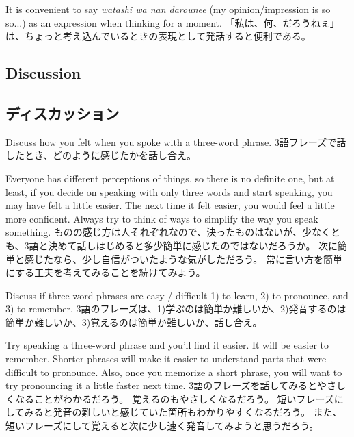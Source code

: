\documentclass[uplatex,dvipdfmx,b5paper,english,10pt]{jsbook}
\begin{document}
\begin{toianswer}
\ifEnglish
It is convenient to say {\it watashi wa nan darounee\/} (my opinion/impression is so so...) as an expression when thinking for a moment.
\else
「私は、何、だろうねぇ」は、ちょっと考え込んでいるときの表現として発話すると便利である。
\fi
\end{toianswer}


\ifEnglish
\subsection{Discussion}
\else
\subsection{ディスカッション}
\fi

\begin{toiquestion}
\ifEnglish
Discuss how you felt when you spoke with a three-word phrase.
\else
3語フレーズで話したとき、どのように感じたかを話し合え。
\fi
\end{toiquestion}
\begin{toianswer} %
\ifEnglish
Everyone has different perceptions of things, so there is no definite one, but at least, if you decide on speaking with only three words and start speaking, you may have felt a little easier.
The next time it felt easier, you would feel a little more confident.
Always try to think of ways to simplify the way you speak something.
\else
ものの感じ方は人それぞれなので、決ったものはないが、少なくとも、3語と決めて話しはじめると多少簡単に感じたのではないだろうか。
次に簡単と感じたなら、少し自信がついたような気がしただろう。
常に言い方を簡単にする工夫を考えてみることを続けてみよう。
\fi
\end{toianswer}

\begin{toiquestion}
\ifEnglish
Discuss if three-word phrases are easy / difficult 1) to learn, 2) to pronounce, and 3) to remember.
\else
3語のフレーズは、1)学ぶのは簡単か難しいか、2)発音するのは簡単か難しいか、3)覚えるのは簡単か難しいか、話し合え。
\fi
\end{toiquestion}
\begin{toianswer} %
\ifEnglish
Try speaking a three-word phrase and you'll find it easier.
It will be easier to remember.
Shorter phrases will make it easier to understand parts that were difficult to pronounce.
Also, once you memorize a short phrase, you will want to try pronouncing it a little faster next time.
\else
3語のフレーズを話してみるとやさしくなることがわかるだろう。
覚えるのもやさしくなるだろう。
短いフレーズにしてみると発音の難しいと感じていた箇所もわかりやすくなるだろう。
また、短いフレーズにして覚えると次に少し速く発音してみようと思うだろう。
\fi
\end{toianswer}
\end{document}
